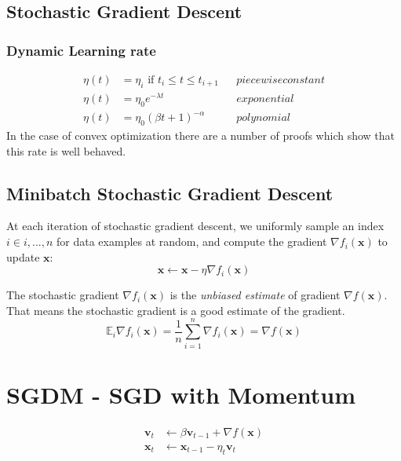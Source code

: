 \subsection{Stochastic Gradient Descent}
\subsubsection{Dynamic Learning rate}

\begin{equation}
    \begin{aligned}
        \eta(t) & = \eta_i \text{ if } t_i \leq  t \leq t_{i+1} &  & piecewise constant \\
        \eta(t) & = \eta_0 e^{-\lambda t}                       &  & exponential        \\
        \eta(t) & = \eta_0 (\beta t + 1) ^{-\alpha}             &  & polynomial
    \end{aligned}
\end{equation}
In the case of convex optimization there are a number of proofs which show that this rate is well behaved.

\subsection{Minibatch Stochastic Gradient Descent}
At each iteration of stochastic gradient descent, we uniformly sample an index $i \in {i,..., n}$ for data examples at
random, and compute the gradient $\nabla f_i(\mathbf{x})$ to update $\mathbf{x}$:
\begin{equation}
    \mathbf{x} \leftarrow \mathbf{x} - \eta \nabla f_i(\mathbf{x})
\end{equation}

The stochastic gradient $\nabla f_i(\mathbf{x})$ is the \textit{unbiased estimate} of gradient $\nabla f(\mathbf{x})$.
That means the stochastic gradient is a good estimate of the gradient.
\begin{equation}
    \mathbb{E}_i \nabla f_i(\mathbf{x}) = \frac{1}{n} \sum_{i=1}^n \nabla f_i (\mathbf{x}) = \nabla f(\mathbf{x})
\end{equation}

\section{SGDM - SGD with Momentum}

\begin{equation}
    \begin{split}
        \mathbf{v}_t &\leftarrow \beta \mathbf{v}_{t-1} + \nabla f(\mathbf{x}) \\
        \mathbf{x}_t &\leftarrow \mathbf{x}_{t-1} - \eta_t \mathbf{v}_{t}
    \end{split}
\end{equation}


